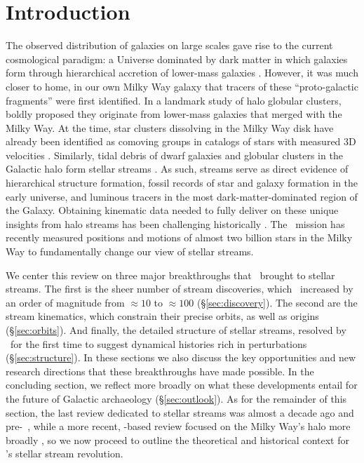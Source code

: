 \documentclass[final,5p,times,twocolumn,authoryear]{elsarticle}
\begin{document}

\section{Introduction}
\label{sec:intro}

The observed distribution of galaxies on large scales gave rise to the current cosmological paradigm: a Universe dominated by dark matter in which galaxies form through hierarchical accretion of lower-mass galaxies \citep{press:1974,white:1978}.
However, it was much closer to home, in our own Milky Way galaxy that tracers of these ``proto-galactic fragments'' were first identified.
In a landmark study of halo globular clusters, \citet{searle:1978} boldly proposed they originate from lower-mass galaxies that merged with the Milky Way.
At the time, star clusters dissolving in the Milky Way disk have already been identified as comoving groups in catalogs of stars with measured 3D velocities \citep[e.g.,][and references therein]{eggen:1965}.
Similarly, tidal debris of dwarf galaxies and globular clusters in the Galactic halo form stellar streams \citep[e.g.,][]{lynden-bell:1995}.
As such, streams serve as direct evidence of hierarchical structure formation, fossil records of star and galaxy formation in the early universe, and luminous tracers in the most dark-matter-dominated region of the Galaxy.
Obtaining kinematic data needed to fully deliver on these unique insights from halo streams has been challenging historically \citep[e.g.,][]{morrison:2000}.
The \gaia\ mission has recently measured positions and motions of almost two billion stars in the Milky Way \citep{gaiamission:2016, gaiadr1, gaiadr2, gaiaedr3, gaiadr3} to fundamentally change our view of stellar streams.

We center this review on three major breakthroughs that \gaia\ brought to stellar streams.
The first is the sheer number of stream discoveries, which \gaia\ increased by an order of magnitude from $\approx10$ to $\approx100$ (\S\ref{sec:discovery}).
The second are the stream kinematics, which constrain their precise orbits, as well as
origins (\S\ref{sec:orbits}).
And finally, the detailed structure of stellar streams, resolved by \gaia\ for the first
time to suggest dynamical histories rich in perturbations (\S\ref{sec:structure}).
In these sections we also discuss the key opportunities and new research directions that these breakthroughs have made possible.
In the concluding section, we reflect more broadly on what these developments entail for the future of Galactic archaeology (\S\ref{sec:outlook}).
As for the remainder of this section, the last review dedicated to stellar streams was almost a decade ago and pre-\gaia\ \citep{newberg:2016}, while a more recent, \gaia-based review focused on the Milky Way's halo more broadly \citep{helmi:2020}, so we now proceed to outline the theoretical and historical context for \gaia's stellar stream revolution.
\end{document}
